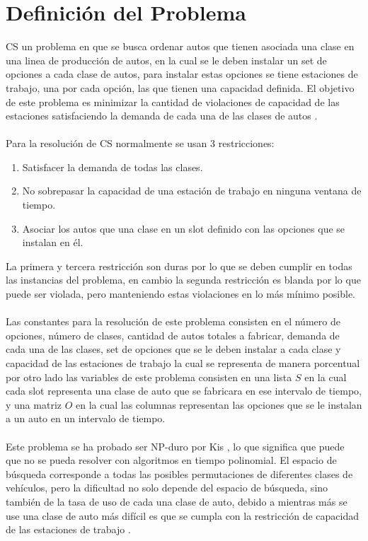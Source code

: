 \documentclass[letter, 10pt]{article}
\begin{document}
\section{Definici\'on del Problema}
CS un problema en que se busca ordenar autos que tienen asociada una clase en una linea de producci\'on de autos, en la cual se le deben instalar un set de opciones a cada clase de autos, para instalar estas opciones se tiene estaciones de trabajo, una por cada opci\'on, las que tienen una capacidad definida. El objetivo de este problema es minimizar la cantidad de violaciones de capacidad de las estaciones satisfaciendo la demanda de cada una de las clases de autos \cite{Dincbas}. 
\\\\ 
Para la resoluci\'on de CS normalmente se usan 3 restricciones:
\begin{enumerate}
    \item Satisfacer la demanda de todas las clases.
    \item No sobrepasar la capacidad de una estaci\'on de trabajo en ninguna ventana de tiempo.
    \item Asociar los autos que una clase en un slot definido con las opciones que se instalan en \'el.
\end{enumerate}
 La primera y tercera restricci\'on son duras por lo que se deben cumplir en todas las instancias del problema, en cambio la segunda restricci\'on es blanda por lo que puede ser violada, pero manteniendo estas violaciones en lo m\'as m\'inimo posible.
\\\\
Las constantes para la resoluci\'on de este problema consisten en el n\'umero de opciones, n\'umero de clases, cantidad de autos totales a fabricar, demanda de cada una de las clases, set de opciones que se le deben instalar a cada clase y capacidad de las estaciones de trabajo la cual se representa de manera porcentual por otro lado las variables de este problema consisten en una lista $S$ en la cual cada slot representa una clase de auto que se fabricara en ese intervalo de tiempo, y una matriz $O$ en la cual las columnas representan las opciones que se le instalan a un auto en un intervalo de tiempo. 
\\\\
Este problema se ha probado ser NP-duro por Kis \cite{Tamas}, lo que significa que puede que no se pueda resolver con algoritmos en tiempo polinomial. El espacio de b\'usqueda corresponde a todas las posibles permutaciones de diferentes clases de veh\'iculos, pero la dificultad no solo depende del espacio de b\'usqueda, sino tambi\'en de la tasa de uso de cada una clase de auto, debido a mientras m\'as se use una clase de auto m\'as dif\'icil es que se cumpla con la restricci\'on de capacidad de las estaciones de trabajo \cite{Lin}. 
\end{document}
